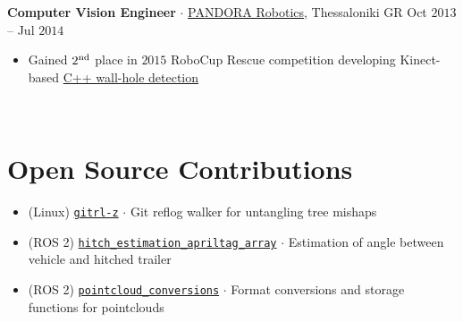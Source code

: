 \documentclass[a4paper,10pt,twoside]{article}
\begin{document}
\noindent \textbf{Computer Vision Engineer} $\cdot$ \href{https://issel.ee.auth.gr/pandora-robotics/}{PANDORA Robotics}, Thessaloniki GR \hfill {\small \textcolor{agray}{Oct $2013$ -- Jul $2014$}}
  \begin{minipage}[t]{\textwidth}
    \begin{itemize}
      \item Gained $2^{\textnormal{nd}}$ place in $2015$ RoboCup Rescue competition developing Kinect-based  \href{https://github.com/li9i/pandora\_vision\_2014}{C++ wall-hole detection}
    \end{itemize}
  \end{minipage} \\ [-0.8em]

\verticalspacebetweensections

\section{\textbf{Open Source Contributions}}\verticalspacebetweensectionandcontent

  \noindent\begin{minipage}[t]{\textwidth}
    \begin{itemize}
      \item (Linux) \href{https://github.com/li9i/gitrl-z}{\texttt{gitrl-z}} $\cdot$ Git reflog walker for untangling tree mishaps\verticalspaceafteritem
      \item (ROS 2) \href{https://index.ros.org/p/hitch_estimation_apriltag_array/#humble}{\texttt{hitch\_estimation\_apriltag\_array}} $\cdot$ Estimation of angle between vehicle and hitched trailer \verticalspaceafteritem
      \item (ROS 2) \href{https://index.ros.org/r/pointcloud_conversions/#lyrical}{\texttt{pointcloud\_conversions}} $\cdot$ Format conversions and storage functions for pointclouds
    \end{itemize}
  \end{minipage} \\ [0.2em]

\verticalspacebetweensections

\end{document}
